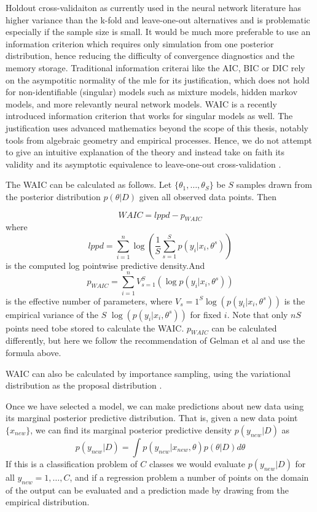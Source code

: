 \documentclass[]{report}
\begin{document}
Holdout cross-validaiton as currently used in the neural network literature
has higher variance than the k-fold and leave-one-out alternatives and is
problematic especially if the sample size is small. It would be much more
preferable to use an information criterion which requires only simulation from
one posterior distribution, hence reducing the difficulty of convergence
diagnostics and the memory storage. Traditional information criterai like the
AIC, BIC or DIC rely on the asympotitic normality of the mle for its
justification, which does not hold for non-identifiable (singular) models such
as mixture models, hidden markov models, and more relevantly neural network
models. WAIC is a recently introduced information criterion that works for
singular models as well. The justification uses advanced mathematics beyond the
scope of this thesis, notably tools from algebraic geometry and empirical
processes. Hence, we do not attempt to give an intuitive explanation of the
theory and instead take on faith its validity and its asymptotic equivalence to
leave-one-out cross-validation \cite{watanabe2010asymptotic}.

The WAIC can be calculated as follows. Let $\{\theta_1, \dots, \theta_S\}$ be $S$ samples drawn from the posterior distribution $p(\theta|D)$ given all observed data points. Then 

\[WAIC = lppd - p_{WAIC} \]
where 
\[lppd = \sum_{i=1}^n \log( \frac{1}{S} \sum_{s=1}^S p(y_i|x_i,\theta^s) ) \]
is the computed log pointwise predictive density.And 
\[p_{WAIC} = \sum_{i=1}^n V_{s=1}^S(\log p(y_i|x_i, \theta^s)) \]
is the effective number of parameters, where $V_s=1^S \log(p(y_i|x_i,\theta^s))$ is the empirical variance of the $S$  $\log(p(y_i|x_i,\theta^s))$ for fixed $i$. Note that only $nS$ points need tobe stored to calculate the WAIC. $p_{WAIC}$ can be calculated differently, but here we follow the recommendation of Gelman et al and use the formula above.

WAIC can also be calculated by importance sampling, using the variational distribution as the proposal distribution \cite{yamada2012information}.

Once we have selected a model, we can make predictions about new data using its marginal posterior predictive distribution. That is, given a new data point $\{x_{new}\}$, we can find its marginal posterior predictive density $p(y_{new}|D)$ as 
\[ p(y_{new}|D) = \int p(y_{new}|x_{new},\theta) p(\theta|D) d\theta \]
If this is a classification problem of $C$ classes we would evaluate $p(y_{new}|D)$ for all $y_{new}=1,\dots, C$, and if a regression problem a number of points on the domain of the output can be evaluated 
and a prediction made by drawing from the empirical distribution. 
\end{document}
